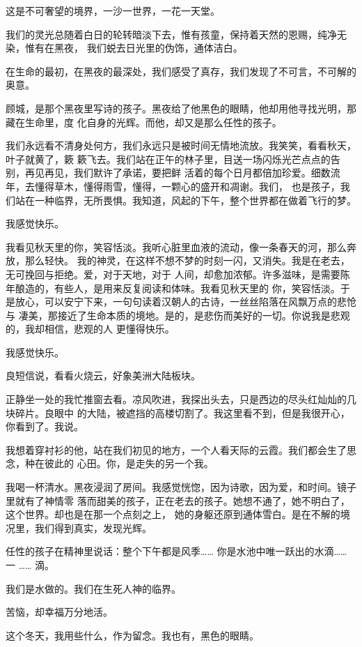 \documentclass[12pt,a4paper]{article}
\begin{document}
		这是不可奢望的境界，一沙一世界，一花一天堂。

		我们的灵光总随着白日的轮转暗淡下去，惟有孩童，保持着天然的恩赐，纯净无染，惟有在黑夜，
	我们蜕去日光里的伪饰，通体洁白。

		在生命的最初，在黑夜的最深处，我们感受了真存，我们发现了不可言，不可解的奥意。

		顾城，是那个黑夜里写诗的孩子。黑夜给了他黑色的眼睛，他却用他寻找光明，那藏在生命里，度
	化自身的光辉。而他，却又是那么任性的孩子。

		我们永远看不清身处何方，我们永远只是被时间无情地流放。我笑笑，看看秋天，叶子就黄了，簌
	簌飞去。我们站在正午的林子里，目送一场闪烁光芒点点的告别，再见再见，我们默许了承诺，要把鲜
	活着的每个日月都倍加珍爱。细数流年，去懂得草木，懂得雨雪，懂得，一颗心的盛开和凋谢。我们，
	也是孩子，我们站在一种临界，无所畏惧。我知道，风起的下午，整个世界都在做着飞行的梦。

		我感觉快乐。

		我看见秋天里的你，笑容恬淡。我听心脏里血液的流动，像一条春天的河，那么奔放，那么轻快。
	我的神灵，在这样不想不梦的时刻一闪，又消失。我是在老去，无可挽回与拒绝。爱，对于天地，对于
	人间，却愈加浓郁。许多滋味，是需要陈年酿造的，有些人，是用来反复阅读和体味。我看见秋天里的
	你，笑容恬淡。于是放心，可以安宁下来，一句句读着汉朝人的古诗，一丝丝陷落在风飘万点的悲怆与
	凄美，那接近了生命本质的境地。是的，是悲伤而美好的一切。你说我是悲观的，我却相信，悲观的人
	更懂得快乐。

		我感觉快乐。

		良短信说，看看火烧云，好象美洲大陆板块。

		正静坐一处的我忙推窗去看。凉风吹进，我探出头去，只是西边的尽头红灿灿的几块碎片。良眼中
	的大陆，被遮挡的高楼切割了。我这里看不到，但是我很开心，你看到了。我说。

		我想着穿衬衫的他，站在我们初见的地方，一个人看天际的云霞。我们都会生了思念，种在彼此的
	心田。你，是走失的另一个我。

		我喝一杯清水。黑夜浸润了房间。我感觉恍惚，因为诗歌，因为爱，和时间。镜子里就有了神情零
	落而甜美的孩子，正在老去的孩子。她想不通了，她不明白了，这个世界。却也是在那一个点刻之上，
	她的身躯还原到通体雪白。是在不解的境况里，我们得到真实，发现光辉。

		任性的孩子在精神里说话：整个下午都是风季…… 你是水池中唯一跃出的水滴…… 一 …… 滴。

		我们是水做的。我们在生死人神的临界。

		苦恼，却幸福万分地活。

		这个冬天，我用些什么，作为留念。我也有，黑色的眼睛。
\end{document}
